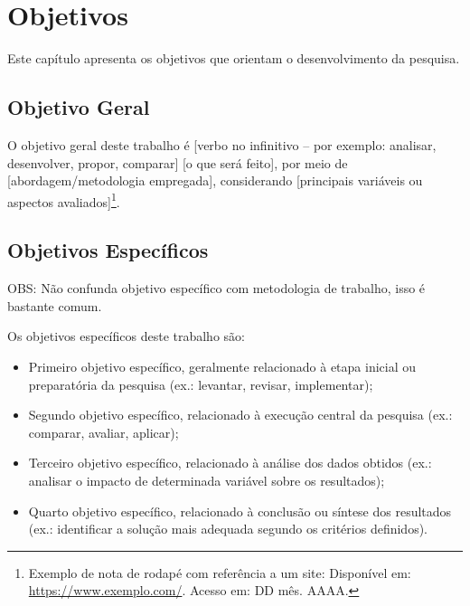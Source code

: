 \chapter{Objetivos}
\label{sec:objetivos}

Este capítulo apresenta os objetivos que orientam o desenvolvimento da pesquisa.

\section{Objetivo Geral}

O objetivo geral deste trabalho é [verbo no infinitivo -- por exemplo: analisar, desenvolver, propor, comparar] [o que será feito], por meio de [abordagem/metodologia empregada], considerando [principais variáveis ou aspectos avaliados]\footnote{Exemplo de nota de rodapé com referência a um site: Disponível em: \url{https://www.exemplo.com/}. Acesso em: DD mês. AAAA.}.

\section{Objetivos Específicos}

OBS: Não confunda objetivo específico com metodologia de trabalho, isso é bastante comum.

Os objetivos específicos deste trabalho são:

\begin{itemize}[leftmargin=*,itemsep=0.5em]

\item Primeiro objetivo específico, geralmente relacionado à etapa inicial ou preparatória da pesquisa (ex.: levantar, revisar, implementar);

\item Segundo objetivo específico, relacionado à execução central da pesquisa (ex.: comparar, avaliar, aplicar);

\item Terceiro objetivo específico, relacionado à análise dos dados obtidos (ex.: analisar o impacto de determinada variável sobre os resultados);

\item Quarto objetivo específico, relacionado à conclusão ou síntese dos resultados (ex.: identificar a solução mais adequada segundo os critérios definidos).

\end{itemize}
